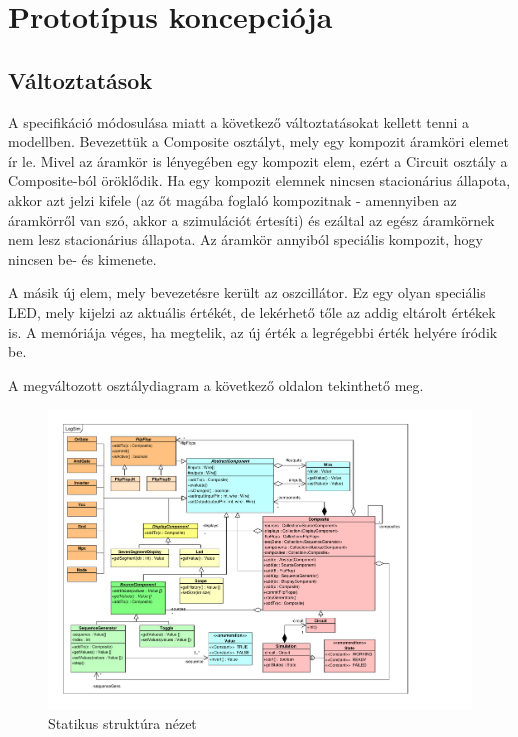%
\chapter{Prototípus koncepciója}

\parindent 0pt
\setcounter{secnumdepth}{3}
\setcounter{tocdepth}{3}
\thispagestyle{fancy}

\setcounter{section}{-1}
\section{Változtatások}

A specifikáció módosulása miatt a következő változtatásokat kellett tenni a modellben.
Bevezettük a Composite osztályt, mely egy kompozit áramköri elemet ír le. Mivel az áramkör is lényegében egy kompozit elem, ezért a Circuit osztály a Composite-ból öröklődik. Ha egy kompozit elemnek nincsen stacionárius állapota, akkor azt jelzi kifele (az őt magába foglaló kompozitnak - amennyiben az áramkörről van szó, akkor a szimulációt értesíti) és ezáltal az egész áramkörnek nem lesz stacionárius állapota. Az áramkör annyiból speciális kompozit, hogy nincsen be- és kimenete.

A másik új elem, mely bevezetésre került az oszcillátor. Ez egy olyan speciális LED, mely kijelzi az aktuális értékét, de lekérhető tőle az addig eltárolt értékek is. A memóriája véges, ha megtelik, az új érték a legrégebbi érték helyére íródik be.

A megváltozott osztálydiagram a következő oldalon tekinthető meg.

\begin{figure}[H]
\begin{center}
\includegraphics*[angle=90, width=17cm, viewport = 25 30 720 565]{chapters/chapter04/classdiagram/class.pdf}
\caption{Statikus struktúra nézet}
\label{fig:class_diagram}
\end{center}
\end{figure}

